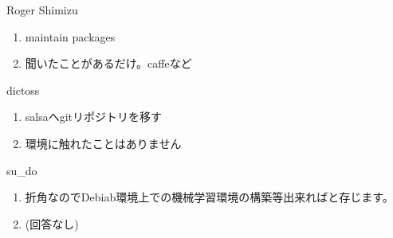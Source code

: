 \begin{prework}{ Roger Shimizu }
  \begin{enumerate}
  \item maintain packages
  \item 聞いたことがあるだけ。caffeなど
  \end{enumerate}
\end{prework}

\begin{prework}{ dictoss }
  \begin{enumerate}
  \item salsaへgitリポジトリを移す
  \item 環境に触れたことはありません
  \end{enumerate}
\end{prework}

\begin{prework}{ su\_do }
  \begin{enumerate}
  \item 折角なのでDebiab環境上での機械学習環境の構築等出来ればと存じます。
  \item (回答なし)
  \end{enumerate}
\end{prework}
